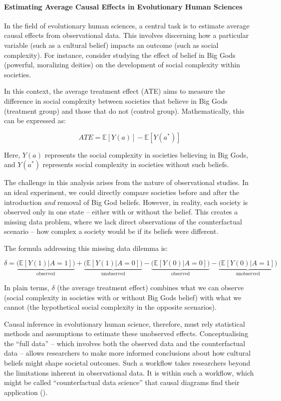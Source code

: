 \documentclass[
  singlecolumn,
  9pt]{article}
\let\oldparagraph\paragraph
\renewcommand{\paragraph}[1]{\oldparagraph{#1}\mbox{}}
\begin{document}
\paragraph{Estimating Average Causal Effects in Evolutionary Human
Sciences}\label{estimating-average-causal-effects-in-evolutionary-human-sciences}

In the field of evolutionary human sciences, a central task is to
estimate average causal effects from observational data. This involves
discerning how a particular variable (such as a cultural belief) impacts
an outcome (such as social complexity). For instance, consider studying
the effect of belief in Big Gods (powerful, moralizing deities) on the
development of social complexity within societies.

In this context, the average treatment effect (ATE) aims to measure the
difference in social complexity between societies that believe in Big
Gods (treatment group) and those that do not (control group).
Mathematically, this can be expressed as:

\[
ATE = \mathbb{E}[Y(a)] - \mathbb{E}[Y(a^*)]
\]

Here, \(Y(a)\) represents the social complexity in societies believing
in Big Gods, and \(Y(a^*)\) represents social complexity in societies
without such beliefs.

The challenge in this analysis arises from the nature of observational
studies. In an ideal experiment, we could directly compare societies
before and after the introduction \emph{and} removal of Big God beliefs.
However, in reality, each society is observed only in one state --
either with or without the belief. This creates a missing data problem,
where we lack direct observations of the counterfactual scenario -- how
complex a society would be if its beliefs were different.

The formula addressing this missing data dilemma is:

\[
\delta = \underbrace{\big(\mathbb{E}[Y(1)|A = 1]\big)}_{\text{observed}} + \underbrace{\big(\mathbb{E}[Y(1)|A = 0]\big)}_{\text{unobserved}} - \underbrace{\big(\mathbb{E}[Y(0)|A = 0]\big)}_{\text{observed}}  - \underbrace{\big(\mathbb{E}[Y(0)|A = 1]\big)}_{\text{unobserved}}
\]

In plain terms, \(\delta\) (the average treatment effect) combines what
we can observe (social complexity in societies with or without Big Gods
belief) with what we cannot (the hypothetical social complexity in the
opposite scenarios).

Causal inference in evolutionary human science, therefore, must rely
statistical methods and assumptions to estimate these unobserved
effects. Conceptualising the ``full data'' -- which involves both the
observed data and the counterfactual data -- allows researchers to make
more informed conclusions about how cultural beliefs might shape
societal outcomes. Such a workflow takes researchers beyond the
limitations inherent in observational data. It is within such a
workflow, which might be called ``counterfactual data science'' that
causal diagrams find their application
().
\end{document}
